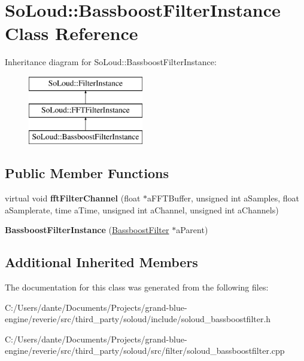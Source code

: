 \hypertarget{class_so_loud_1_1_bassboost_filter_instance}{}\section{So\+Loud\+::Bassboost\+Filter\+Instance Class Reference}
\label{class_so_loud_1_1_bassboost_filter_instance}
Inheritance diagram for So\+Loud\+::Bassboost\+Filter\+Instance\+:\begin{figure}[H]
\begin{center}
\leavevmode
\includegraphics[height=3.000000cm]{class_so_loud_1_1_bassboost_filter_instance}
\end{center}
\end{figure}
\subsection*{Public Member Functions}
\begin{DoxyCompactItemize}
\item 
\mbox{\label{class_so_loud_1_1_bassboost_filter_instance_a54b14946efea57fee2f979bcb1b74aec}} 
virtual void {\bfseries fft\+Filter\+Channel} (float $\ast$a\+F\+F\+T\+Buffer, unsigned int a\+Samples, float a\+Samplerate, time a\+Time, unsigned int a\+Channel, unsigned int a\+Channels)
\item 
\mbox{\label{class_so_loud_1_1_bassboost_filter_instance_a3f96f0c9adbb5aba9cfe37a2585607cf}} 
{\bfseries Bassboost\+Filter\+Instance} (\mbox{\hyperlink{class_so_loud_1_1_bassboost_filter}{Bassboost\+Filter}} $\ast$a\+Parent)
\end{DoxyCompactItemize}
\subsection*{Additional Inherited Members}


The documentation for this class was generated from the following files\+:\begin{DoxyCompactItemize}
\item 
C\+:/\+Users/dante/\+Documents/\+Projects/grand-\/blue-\/engine/reverie/src/third\+\_\+party/soloud/include/soloud\+\_\+bassboostfilter.\+h\item 
C\+:/\+Users/dante/\+Documents/\+Projects/grand-\/blue-\/engine/reverie/src/third\+\_\+party/soloud/src/filter/soloud\+\_\+bassboostfilter.\+cpp\end{DoxyCompactItemize}
